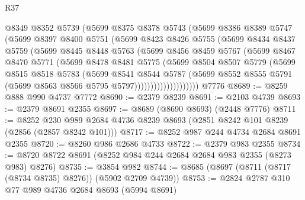 \begin{lexlean}{R37}
\begin{coremodule}
                @8349
                @8352
                @5739
                (@5699
                  @8375
                  @8378
                  @5743
                  (@5699
                    @8386
                    @8389
                    @5747
                    (@5699
                      @8397
                      @8400
                      @5751
                      (@5699
                        @8423
                        @8426
                        @5755
                        (@5699
                          @8434
                          @8437
                          @5759
                          (@5699
                            @8445
                            @8448
                            @5763
                            (@5699
                              @8456
                              @8459
                              @5767
                              (@5699
                                @8467
                                @8470
                                @5771
                                (@5699
                                  @8478
                                  @8481
                                  @5775
                                  (@5699
                                    @8504
                                    @8507
                                    @5779
                                    (@5699
                                      @8515
                                      @8518
                                      @5783
                                      (@5699
                                        @8541
                                        @8544
                                        @5787
                                        (@5699
                                          @8552
                                          @8555
                                          @5791
                                          (@5699 @8563 @8566 @5795 @5797))))))))))))))))))))
    @7776
@8689 := @8259 @888 @990 @4737 @7772
@8690 := @2379 @8239
@8691 := @2103 @4739
@8693 := @2379 @8691 @2355
@8697 := @8689 (@8690 @8693) (@2448 @7776)
@8711 := @8252 @230 @989 @2684 @4736 @8239 @8693 (@2851 @8242 @101 @8239 (@2856 (@2857 @8242 @101)))
@8717 := @8252 @987 @244 @4734 @2684 @8691 @2355
@8720 := @8260 @986 @2686 @4733
@8722 := @2379 @983 @2355
@8734 := @8720 @8722 @8691 (@8252 @984 @244 @2684 @2684 @983 @2355 (@8273 @983) @8276)
@8735 := @3854 @982
@8744 := @8685 (@8697 (@8711 (@8717 (@8734 @8735) @8276)) (@5902 @2709 @4739))
@8753 := @2824 @2787 @310 @77 @989 @4736 @2684 @8693 (@5994 @8691)

\end{coremodule}
\end{lexlean}
